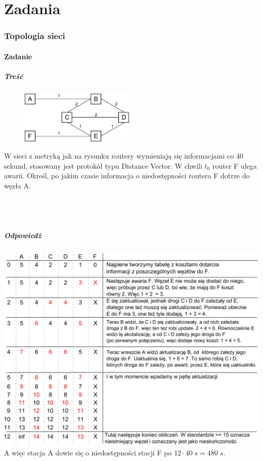 \documentclass[a4paper,twoside]{article}
\begin{document}
	
\part{Zadania}
\section{Topologia sieci}
\subsection{Zadanie}
\subsubsection{Treść}
\begin{figure}
	\includegraphics[width=5.5cm]{./images/zadanie02.pdf}
\end{figure} 
W sieci z metryką jak na rysunku routery wymieniają się informacjami co 40 sekund, stosowany jest protokół typu Distance Vector. W chwili $ t_0 $ router F ulega awarii. Określ, po jakim czasie informacja o niedostępności routera F dotrze do węzła A.\\\\\\\\
\subsubsection{Odpowiedź}
\includegraphics[width=16.0cm]{./images/zadanie03.pdf}\\
A więc stacja A dowie się o niedostępności stacji F po $ 12\cdot 40\;s=480\;s $.
\newpage
\end{document}
